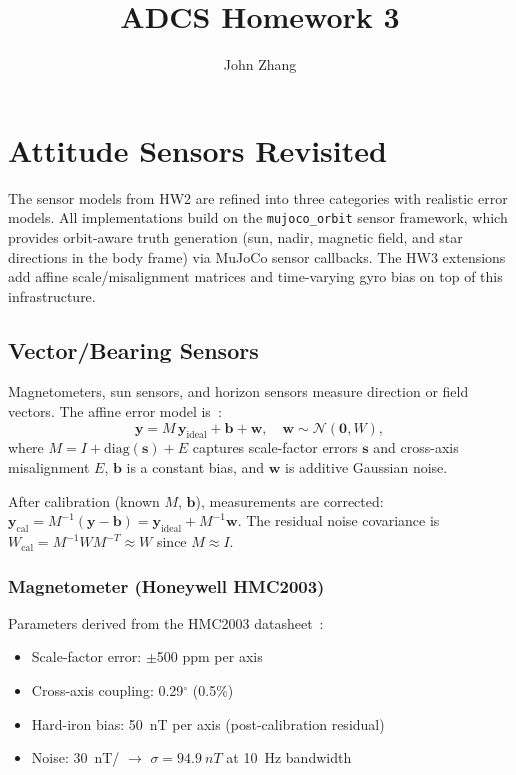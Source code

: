 \documentclass[conference]{IEEEtran}
\title{ADCS Homework 3}
\author{John Zhang}
\begin{document}
\maketitle

\section{Attitude Sensors Revisited}
\label{sec:sensors}

The sensor models from HW2 are refined into three categories with realistic
error models.  All implementations build on the \texttt{mujoco\_orbit} sensor
framework, which provides orbit-aware truth generation (sun, nadir, magnetic
field, and star directions in the body frame) via MuJoCo sensor callbacks.
The HW3 extensions add affine scale/misalignment matrices and time-varying
gyro bias on top of this infrastructure.

\subsection{Vector/Bearing Sensors}

Magnetometers, sun sensors, and horizon sensors measure direction or field
vectors.  The affine error model is~\cite{markley2014}:
\begin{equation}
  \bm{y} = M\,\bm{y}_{\text{ideal}} + \bm{b} + \bm{w},
  \quad \bm{w} \sim \mathcal{N}(\bm{0}, W),
  \label{eq:affine}
\end{equation}
where $M = I + \text{diag}(\bm{s}) + E$ captures scale-factor errors
$\bm{s}$ and cross-axis misalignment $E$, $\bm{b}$ is a constant bias,
and $\bm{w}$ is additive Gaussian noise.

After calibration (known $M$, $\bm{b}$), measurements are corrected:
$\bm{y}_{\text{cal}} = M^{-1}(\bm{y} - \bm{b}) = \bm{y}_{\text{ideal}} + M^{-1}\bm{w}$.
The residual noise covariance is $W_{\text{cal}} = M^{-1}WM^{-T} \approx W$
since $M \approx I$.

\subsubsection{Magnetometer (Honeywell HMC2003)}

Parameters derived from the HMC2003 datasheet~\cite{hmc2003}:
\begin{itemize}
  \item Scale-factor error: $\pm$500 ppm per axis
  \item Cross-axis coupling: 0.29$^\circ$ (0.5\%)
  \item Hard-iron bias: \SI{50}{nT} per axis (post-calibration residual)
  \item Noise: \SI{30}{nT/} $\rightarrow$ $\sigma = \SI{94.9}{nT}$
        at \SI{10}{Hz} bandwidth
\end{itemize}
\end{document}
